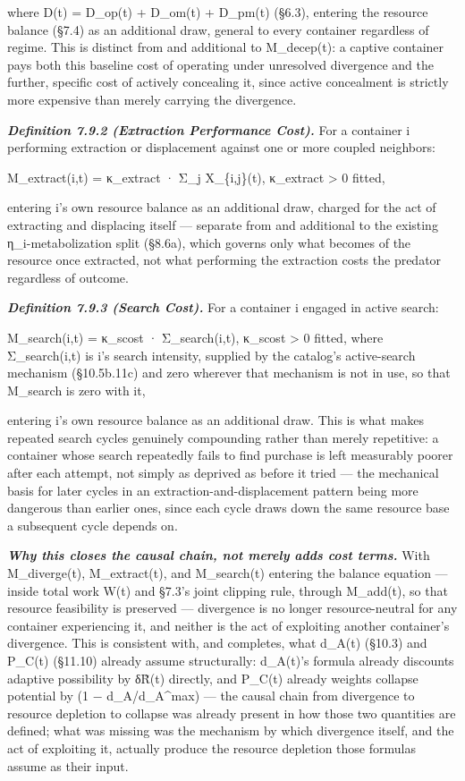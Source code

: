 \documentclass[
]{article}
\begin{document}
where D(t) = D\_op(t) + D\_om(t) + D\_pm(t) (§6.3), entering the
resource balance (§7.4) as an additional draw, general to every
container regardless of regime. This is distinct from and additional to
M\_decep(t): a captive container pays both this baseline cost of
operating under unresolved divergence and the further, specific cost of
actively concealing it, since active concealment is strictly more
expensive than merely carrying the divergence.

\emph{\textbf{Definition 7.9.2 (Extraction Performance Cost).}} For a
container i performing extraction or displacement against one or more
coupled neighbors:

M\_extract(i,t) = κ\_extract · Σ\_j X\_\{i,j\}(t), κ\_extract
\textgreater{} 0 fitted,

entering i's own resource balance as an additional draw, charged for the
act of extracting and displacing itself --- separate from and additional
to the existing η\_i-metabolization split (§8.6a), which governs only
what becomes of the resource once extracted, not what performing the
extraction costs the predator regardless of outcome.

\emph{\textbf{Definition 7.9.3 (Search Cost).}} For a container i
engaged in active search:

M\_search(i,t) = κ\_scost · Σ\_search(i,t), κ\_scost \textgreater{} 0
fitted, where Σ\_search(i,t) is i's search intensity, supplied by the
catalog's active-search mechanism (§10.5b.11c) and zero wherever that
mechanism is not in use, so that M\_search is zero with it,

entering i's own resource balance as an additional draw. This is what
makes repeated search cycles genuinely compounding rather than merely
repetitive: a container whose search repeatedly fails to find purchase
is left measurably poorer after each attempt, not simply as deprived as
before it tried --- the mechanical basis for later cycles in an
extraction-and-displacement pattern being more dangerous than earlier
ones, since each cycle draws down the same resource base a subsequent
cycle depends on.

\emph{\textbf{Why this closes the causal chain, not merely adds cost
terms.}} With M\_diverge(t), M\_extract(t), and M\_search(t) entering
the balance equation --- inside total work W(t) and §7.3's joint
clipping rule, through M\_add(t), so that resource feasibility is
preserved --- divergence is no longer resource-neutral for any container
experiencing it, and neither is the act of exploiting another
container's divergence. This is consistent with, and completes, what
d\_A(t) (§10.3) and P\_C(t) (§11.10) already assume structurally:
d\_A(t)'s formula already discounts adaptive possibility by δR̃(t)
directly, and P\_C(t) already weights collapse potential by (1 −
d\_A/d\_A\^{}max) --- the causal chain from divergence to resource
depletion to collapse was already present in how those two quantities
are defined; what was missing was the mechanism by which divergence
itself, and the act of exploiting it, actually produce the resource
depletion those formulas assume as their input.
\end{document}
